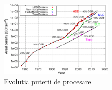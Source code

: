 \begin{figure}
	\centering
	\includegraphics[width=0.5\textwidth]{memory_trends}
	\caption{Evoluția puterii de procesare\cite{memory_trends} }
	\label{fig:memory_trends}
\end{figure}

